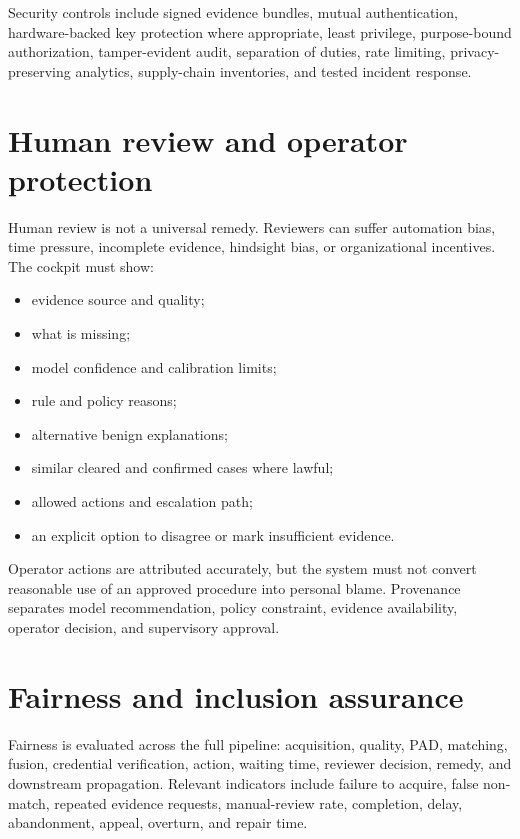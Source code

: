 Security controls include signed evidence bundles, mutual authentication, hardware-backed key protection where appropriate, least privilege, purpose-bound authorization, tamper-evident audit, separation of duties, rate limiting, privacy-preserving analytics, supply-chain inventories, and tested incident response.

\section{Human review and operator protection}

Human review is not a universal remedy. Reviewers can suffer automation bias, time pressure, incomplete evidence, hindsight bias, or organizational incentives. The cockpit must show:

\begin{itemize}
\item evidence source and quality;
\item what is missing;
\item model confidence and calibration limits;
\item rule and policy reasons;
\item alternative benign explanations;
\item similar cleared and confirmed cases where lawful;
\item allowed actions and escalation path;
\item an explicit option to disagree or mark insufficient evidence.
\end{itemize}

Operator actions are attributed accurately, but the system must not convert reasonable use of an approved procedure into personal blame. Provenance separates model recommendation, policy constraint, evidence availability, operator decision, and supervisory approval.

\section{Fairness and inclusion assurance}

Fairness is evaluated across the full pipeline: acquisition, quality, PAD, matching, fusion, credential verification, action, waiting time, reviewer decision, remedy, and downstream propagation. Relevant indicators include failure to acquire, false non-match, repeated evidence requests, manual-review rate, completion, delay, abandonment, appeal, overturn, and repair time.


